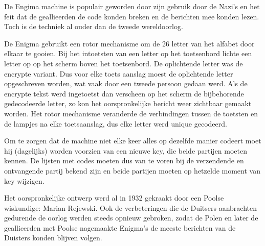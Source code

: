 De Engima machine is populair geworden door zijn gebruik door de Nazi's en het feit dat de geallieerden de code konden breken en de berichten mee konden lezen. Toch is de techniek al ouder dan de tweede wereldoorlog.

De Enigma gebruikt een rotor mechanisme om de 26 letter van het alfabet door elkaar te gooien. Bij het intoetsten van een letter op het toetsenbord lichte een letter op op het scherm boven het toetsenbord. De oplichtende letter was de encrypte variant. Dus voor elke toets aanslag moest de oplichtende letter opgeschreven worden, wat vaak door een tweede persoon gedaan werd. Als de encrypte tekst werd ingetoetst dan verscheen op het scherm de bijbehorende gedecodeerde letter, zo kon het oorspronkelijke bericht weer zichtbaar gemaakt worden. Het rotor mechanisme veranderde de verbindingen tussen de toetsten en de lampjes na elke toetsaanslag, dus elke letter werd unique gecodeerd.

Om te zorgen dat de machine niet elke keer alles op dezelfde manier codeert moet hij (dagelijks) worden voorzien van een nieuwe key, die beide partijen moeten kennen. De lijsten met codes moeten dus van te voren bij de verzendende en ontvangende partij bekend zijn en beide partijen moeten op hetzelde moment van key wijzigen.

Het oorspronkelijke ontwerp werd al in 1932 gekraakt door een Poolse wiskundige: Marian Rejewski. Ook de verbeteringen die de Duitsers aanbrachten gedurende de oorlog werden steeds opnieuw gebroken, zodat de Polen en later de geallieerden met Poolse nagemaakte Enigma's de meeste berichten van de Duisters konden blijven volgen.

